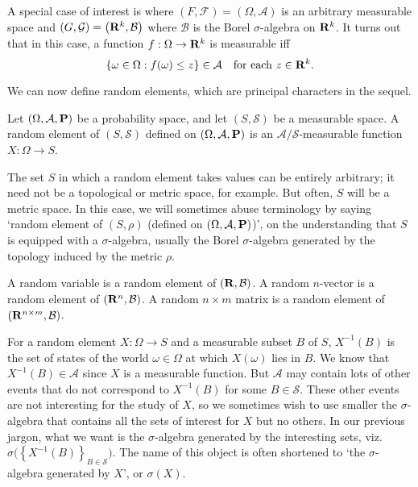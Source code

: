\documentclass[11pt,letterpaper,reqno,oneside]{article}
\begin{document}
A special case of interest is where $(F,\mathcal{F}) = (\Omega,\mathcal{A})$ is an arbitrary measurable space and $(G,\mathcal{G}) = \bigl(\mathbf{R}^k,\mathcal{B}\bigr)$ where $\mathcal{B}$ is the Borel $\sigma$-algebra on $\mathbf{R}^k$. It turns out that in this case, a function $f : \Omega \to \mathbf{R}^k$ is measurable iff
%
\begin{equation*}
	\{ \omega \in \Omega : f(\omega) \leq z \} \in \mathcal{A}
	\quad \text{for each $z \in \mathbf{R}^k$} .
\end{equation*}


We can now define random elements, which are principal characters in the sequel.
%
\begin{definition}
	Let $(\Omega,\mathcal{A},\mathbf{P})$ be a probability space, and let $(S,\mathcal{S})$ be a measurable space. A random element of $(S,\mathcal{S})$ defined on $(\Omega,\mathcal{A},\mathbf{P})$ is an $\mathcal{A}/\mathcal{S}$-measurable function $X : \Omega \to S$.
\end{definition}
%
The set $S$ in which a random element takes values can be entirely arbitrary; it need not be a topological or metric space, for example. But often, $S$ will be a metric space. In this case, we will sometimes abuse terminology by saying `random element of $(S,\rho)$ (defined on $(\Omega,\mathcal{A},\mathbf{P})$)', on the understanding that $S$ is equipped with a $\sigma$-algebra, usually the Borel $\sigma$-algebra generated by the topology induced by the metric $\rho$.

\begin{definition}
	A random variable is a random element of $\left(\mathbf{R},\mathcal{B}\right)$.
	A random $n$-vector is a random element of $\left(\mathbf{R}^n,\mathcal{B}\right)$.
	A random $n \times m$ matrix is a random element of $\left(\mathbf{R}^{n \times m},\mathcal{B}\right)$.
\end{definition}


For a random element $X : \Omega \to S$ and a measurable subset $B$ of $S$, $X^{-1}(B)$ is the set of states of the world $\omega \in \Omega$ at which $X(\omega)$ lies in $B$. We know that $X^{-1}(B) \in \mathcal{A}$ since $X$ is a measurable function. But $\mathcal{A}$ may contain lots of other events that do not correspond to $X^{-1}(B)$ for some $B \in \mathcal{S}$. These other events are not interesting for the study of $X$, so we sometimes wish to use smaller the $\sigma$-algebra that contains all the sets of interest for $X$ but no others. In our previous jargon, what we want is the $\sigma$-algebra generated by the interesting sets, viz. $\sigma\bigl( \left\{ X^{-1}(B) \right\}_{ B \in \mathcal{S} } \bigr)$. The name of this object is often shortened to `the $\sigma$-algebra generated by $X$', or $\sigma(X)$.
\end{document}
